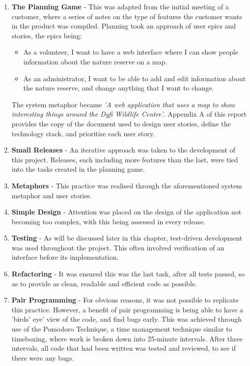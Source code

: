 \begin{enumerate}
\item \textbf{The Planning Game} - This was adapted from the initial meeting of a customer, where a series of notes on the type of features the customer wants in the product was compiled. Planning took an approach of user epics and stories, the epics being:
	\begin{itemize}
		\item	As a volunteer, I want to have a web interface where I can show people information about the nature reserve on a map.
		\item	As an administrator, I want to be able to add and edit information about the nature reserve, and change anything that I want to change.
	\end{itemize}
	
The system metaphor became \textit{'A web application that uses a map to show interesting things around the Dyfi Wildlife Centre'}. Appendix A of this report provides the copy of the document used to design user stories, define the technology stack, and prioritise each user story.
\item	\textbf{Small Releases} - An iterative approach was taken to the development of this project. Releases, each including more features than the last, were tied into the tasks created in the planning game.
\item	\textbf{Metaphors} - This practice was realised through the aforementioned system metaphor and user stories.
\item	\textbf{Simple Design} - Attention was placed on the design of the application not becoming too complex, with this being assessed in every release.
\item	\textbf{Testing} - As will be discussed later in this chapter, test-driven development was used throughout the project. This often involved verification of an interface before its implementation.
\item	\textbf{Refactoring} - It was ensured this was the last task, after all tests passed, so as to provide as clean, readable and efficient code as possible.
\item	\textbf{Pair Programming} - For obvious reasons, it was not possible to replicate this practice. However, a benefit of pair programming is being able to have a 'birds' eye' view of the code, and find bugs early. This was achieved through use of the Pomodoro Technique, a time management technique similar to timeboxing, where work is broken down into 25-minute intervals\cite{GavettGretchen2018Yvtc}. After three intervals, all code that had been written was tested and reviewed, to see if there were any bugs.

\end{enumerate}
